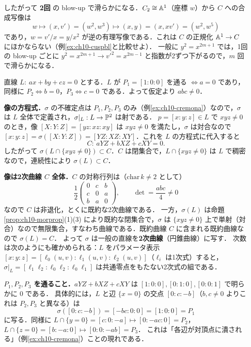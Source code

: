 したがって \textbf{2回} の blow-up で滑らかになる．$C_2\cong\mathbb{A}^1$（座標 $w$）から $C$ への合成写像は
\[
  w\mapsto(x,v')=(w^2,w^3)\mapsto(x,y)=(x,xv')=(w^2,w^5)
\]
であり，$w=v'/x=y/x^2$ が逆の有理写像である．これは $C$ の正規化 $\mathbb{A}^1\to C$ にほかならない（例\ref{ex:ch10-cuspbl}と比較せよ）．
一般に $y^2=x^{2m+1}$ では，1回の blow-up ごとに $y^2=x^{2m+1}\to v'^2=x^{2m-1}$ と指数が2ずつ下がるので，$m$ 回で滑らかになる．

直線 $L:\ ax+by+cz=0$ とする．$L$ が $P_1=[1:0:0]$ を通る $\iff a=0$ であり，同様に $P_2\iff b=0$，$P_3\iff c=0$ である．よって仮定より $abc\neq0$．

\textbf{像の方程式．}$\sigma$ の不確定点は $P_1,P_2,P_3$ のみ（例\ref{ex:ch10-cremona}）なので，$\sigma$ は $L$ 全体で定義され，$\sigma|_L:L\to\mathbb{P}^2$ は射である．
$p=[x:y:z]\in L$ で $xyz\neq0$ のとき，像 $[X:Y:Z]=[yz:xz:xy]$ は $xyz\neq0$ を満たし，$\sigma$ は対合なので $[x:y:z]=\sigma([X:Y:Z])=[YZ:XZ:XY]$．これを $L$ の方程式に代入すると
\[
  C:\ aYZ+bXZ+cXY=0.
\]
したがって $\sigma(L\cap\{xyz\neq0\})\subset C$．$C$ は閉集合で，$L\cap\{xyz\neq0\}$ は $L$ で稠密なので，連続性により $\sigma(L)\subset C$．

\textbf{像は2次曲線 $C$ 全体．}$C$ の対称行列は（$\mathrm{char}\,k\neq2$ として）
\[
  \frac12\begin{pmatrix}0&c&b\\ c&0&a\\ b&a&0\end{pmatrix},\qquad \det=\frac{abc}{4}\neq0
\]
なので $C$ は非退化，とくに既約な2次曲線である．
一方，$\sigma(L)$ は命題\ref{prop:ch10-morprop}(1)(3) により既約な閉集合で，$\sigma$ は $\{xyz\neq0\}$ 上で単射（対合）なので無限集合，すなわち曲線である．既約曲線 $C$ に含まれる既約曲線なので $\sigma(L)=C$．
よって $\sigma$ は一般の直線を\textbf{2次曲線}（円錐曲線）に写す．
次数は次のようにも確かめられる：$L$ をパラメータ表示 $[x:y:z]=[\ell_0(u,v):\ell_1(u,v):\ell_2(u,v)]$（$\ell_i$ は1次式）すると，$\sigma|_L=[\ell_1\ell_2:\ell_0\ell_2:\ell_0\ell_1]$ は共通零点をもたない2次式の組である．

\textbf{$P_1,P_2,P_3$ を通ること．}$aYZ+bXZ+cXY$ は $[1:0:0],[0:1:0],[0:0:1]$ で明らかに $0$ である．
具体的には，$L$ と辺 $\{x=0\}$ の交点 $[0:c:-b]$（$b,c\neq0$ よりこれは $P_2,P_3$ と異なる）は
\[
  \sigma([0:c:-b])=[-bc:0:0]=[1:0:0]=P_1
\]
に写る．同様に $L\cap\{y=0\}=[c:0:-a]\mapsto[0:-ac:0]=P_2$，$L\cap\{z=0\}=[b:-a:0]\mapsto[0:0:-ab]=P_3$．
これは「各辺が対頂点に潰される」（例\ref{ex:ch10-cremona}）ことの現れである．

